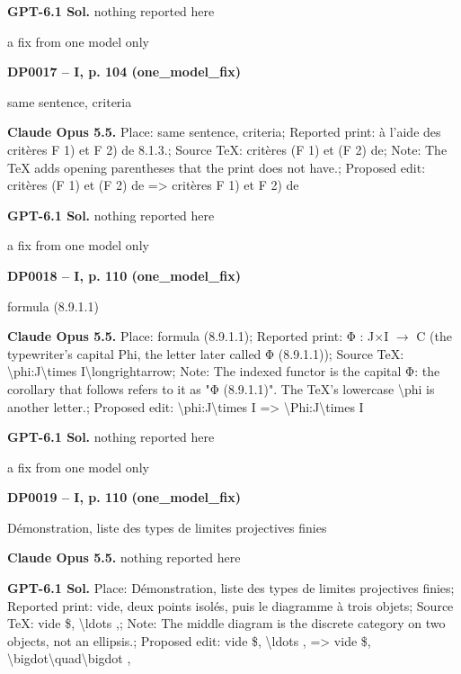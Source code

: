 \textbf{GPT-6.1 Sol.} nothing reported here\par
a fix from one model only\par
\par\noindent\hypertarget{DP0017}{}\textbf{DP0017 -- I, p. 104 (one\_model\_fix)}\par
same sentence, criteria\par
\textbf{Claude Opus 5.5.} Place: same sentence, criteria; Reported print: à l'aide des critères F 1) et F 2) de 8.1.3.; Source TeX: critères (F 1) et (F 2) de; Note: The TeX adds opening parentheses that the print does not have.; Proposed edit: critères (F 1) et (F 2) de =\allowbreak > critères F 1) et F 2) de\par
\textbf{GPT-6.1 Sol.} nothing reported here\par
a fix from one model only\par
\par\noindent\hypertarget{DP0018}{}\textbf{DP0018 -- I, p. 110 (one\_model\_fix)}\par
formula (8.9.1.1)\par
\textbf{Claude Opus 5.5.} Place: formula (8.9.1.1); Reported print: Φ : J\ensuremath{\times}I \ensuremath{\to} C (the typewriter's capital Phi, the letter later called Φ (8.9.1.1)); Source TeX: \textbackslash{}phi:J\textbackslash{}times I\textbackslash{}longrightarrow; Note: The indexed functor is the capital Φ: the corollary that follows refers to it as "Φ (8.9.1.1)". The TeX's lowercase \textbackslash{}phi is another letter.; Proposed edit: \textbackslash{}phi:J\textbackslash{}times I =\allowbreak > \textbackslash{}Phi:J\textbackslash{}times I\par
\textbf{GPT-6.1 Sol.} nothing reported here\par
a fix from one model only\par
\par\noindent\hypertarget{DP0019}{}\textbf{DP0019 -- I, p. 110 (one\_model\_fix)}\par
Démonstration, liste des types de limites projectives finies\par
\textbf{Claude Opus 5.5.} nothing reported here\par
\textbf{GPT-6.1 Sol.} Place: Démonstration, liste des types de limites projectives finies; Reported print: vide, deux points isolés, puis le diagramme à trois objets; Source TeX: vide \$, \textbackslash{}ldots ,; Note: The middle diagram is the discrete category on two objects, not an ellipsis.; Proposed edit: vide \$, \textbackslash{}ldots , =\allowbreak > vide \$, \textbackslash{}bigdot\textbackslash{}quad\textbackslash{}bigdot ,\par
